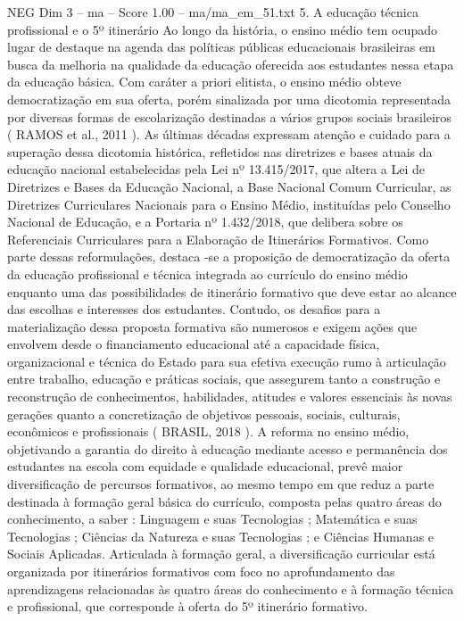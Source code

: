 \begin{textsample}{NEG Dim 3 – ma – Score 1.00 – ma/ma\_em\_51.txt}  \label{ex:f3_neg_148}
5.
A educação técnica profissional e o 5º itinerário Ao longo da história, o ensino médio tem ocupado lugar de destaque na agenda das políticas públicas educacionais brasileiras em busca da melhoria na qualidade da educação oferecida aos estudantes nessa etapa da educação básica.
Com caráter a priori elitista, o ensino médio obteve democratização em sua oferta, porém sinalizada por uma dicotomia representada por diversas formas de escolarização destinadas a vários grupos sociais brasileiros ( RAMOS et al., 2011 ).
As últimas décadas expressam atenção e cuidado para a superação dessa dicotomia histórica, refletidos nas diretrizes e bases atuais da educação nacional estabelecidas pela Lei nº 13.415/2017, que altera a Lei de Diretrizes e Bases da Educação Nacional, a Base Nacional Comum Curricular, as Diretrizes Curriculares Nacionais para o Ensino Médio, instituídas pelo Conselho Nacional de Educação, e a Portaria nº 1.432/2018, que delibera sobre os Referenciais Curriculares para a Elaboração de Itinerários Formativos.
Como parte dessas reformulações, destaca -se a proposição de democratização da oferta da educação profissional e técnica integrada ao currículo do ensino médio enquanto uma das possibilidades de itinerário formativo que deve estar ao alcance das escolhas e interesses dos estudantes.
Contudo, os desafios para a materialização dessa proposta formativa são numerosos e exigem ações que envolvem desde o financiamento educacional até a capacidade física, organizacional e técnica do Estado para sua efetiva execução rumo à articulação entre trabalho, educação e práticas sociais, que assegurem tanto a construção e reconstrução de conhecimentos, habilidades, atitudes e valores essenciais às novas gerações quanto a concretização de objetivos pessoais, sociais, culturais, econômicos e profissionais ( BRASIL, 2018 ).
A reforma no ensino médio, objetivando a garantia do direito à educação mediante acesso e permanência dos estudantes na escola com equidade e qualidade educacional, prevê maior diversificação de percursos formativos, ao mesmo tempo em que reduz a parte destinada à formação geral básica do currículo, composta pelas quatro áreas do conhecimento, a saber : Linguagem e suas Tecnologias ; Matemática e suas Tecnologias ; Ciências da Natureza e suas Tecnologias ; e Ciências Humanas e Sociais Aplicadas.
Articulada à formação geral, a diversificação curricular está organizada por itinerários formativos com foco no aprofundamento das aprendizagens relacionadas às quatro áreas do conhecimento e à formação técnica e profissional, que corresponde à oferta do 5º itinerário formativo.

\end{textsample}
